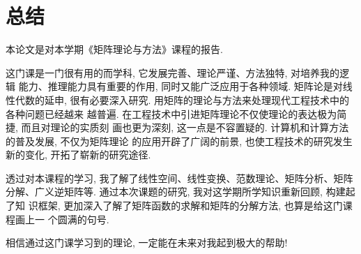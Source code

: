 \section{总结}

\par 本论文是对本学期《矩阵理论与方法》课程的报告.

\par 这门课是一门很有用的而学科, 它发展完善、理论严谨、方法独特, 对培养我的逻辑
能力、推理能力具有重要的作用, 同时又能广泛应用于各种领域. 矩阵论是对线性代数的延申, 很有必要深入研究. 用矩阵的理论与方法来处理现代工程技术中的各种问题已经越来
越普遍. 在工程技术中引进矩阵理论不仅使理论的表达极为简捷, 而且对理论的实质刻
画也更为深刻, 这一点是不容置疑的. 计算机和计算方法的普及发展, 不仅为矩阵理论
的应用开辟了广阔的前景, 也使工程技术的研究发生新的变化, 开拓了崭新的研究途径.

\par 透过对本课程的学习, 我了解了线性空间、线性变换、范数理论、矩阵分析、矩阵
分解、广义逆矩阵等. 通过本次课题的研究, 我对这学期所学知识重新回顾, 构建起了知
识框架, 更加深入了解了矩阵函数的求解和矩阵的分解方法, 也算是给这门课程画上一
个圆满的句号.

\par 相信通过这门课学习到的理论, 一定能在未来对我起到极大的帮助!